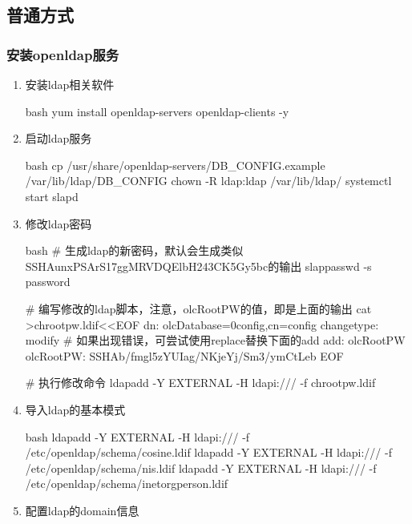 \subsection{普通方式}

\subsubsection{安装openldap服务}
\begin{enumerate}

  \item 安装ldap相关软件

  \begin{code-block}{bash}
  yum install openldap-servers openldap-clients -y
  \end{code-block}

  \item 启动ldap服务

  \begin{code-block}{bash}
  cp /usr/share/openldap-servers/DB_CONFIG.example /var/lib/ldap/DB_CONFIG
  chown -R ldap:ldap  /var/lib/ldap/
  systemctl start slapd
  \end{code-block}

  \item 修改ldap密码

  \begin{code-block}{bash}
  # 生成ldap的新密码，默认会生成类似{SSHA}unxPSArS17ggMRVDQElbH243CK5Gy5bc的输出
  slappasswd -s password

  # 编写修改的ldap脚本，注意，olcRootPW的值，即是上面的输出
  cat >chrootpw.ldif<<EOF
  dn: olcDatabase={0}config,cn=config
  changetype: modify
  # 如果出现错误，可尝试使用replace替换下面的add
  add: olcRootPW
  olcRootPW: {SSHA}b/fmgl5zYUIag/NKjeYj/Sm3/ymCtLeb
  EOF

  # 执行修改命令
  ldapadd -Y EXTERNAL -H ldapi:/// -f chrootpw.ldif
  \end{code-block}

  \item 导入ldap的基本模式

  \begin{code-block}{bash}
  ldapadd -Y EXTERNAL -H ldapi:/// -f /etc/openldap/schema/cosine.ldif
  ldapadd -Y EXTERNAL -H ldapi:/// -f /etc/openldap/schema/nis.ldif
  ldapadd -Y EXTERNAL -H ldapi:/// -f /etc/openldap/schema/inetorgperson.ldif
  \end{code-block}


  \item 配置ldap的domain信息


\end{enumerate}
